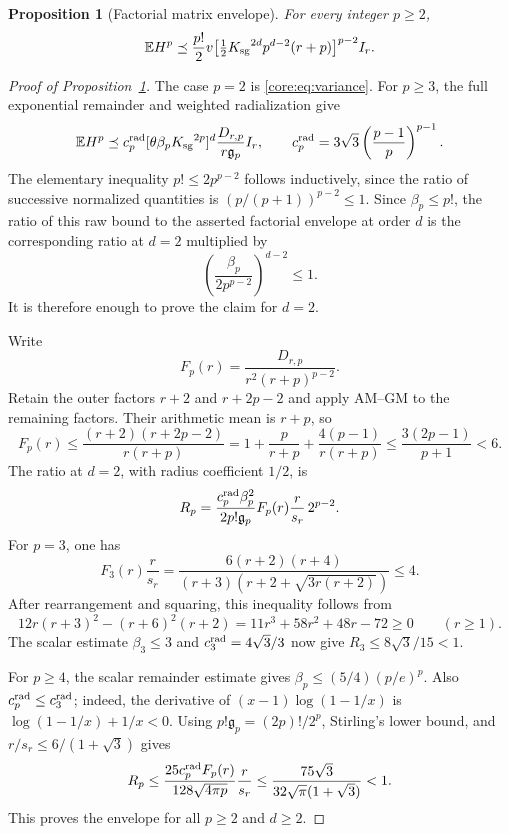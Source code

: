 \documentclass[11pt,a4paper]{article}
\newtheorem{proposition}[theorem]{Proposition}
\theoremstyle{definition}\newtheorem{definition}[theorem]{Definition}
\theoremstyle{remark}\newtheorem{remark}[theorem]{Remark}
\numberwithin{equation}{section}
\newcommand{\Ksg}{{K_{\mathrm{sg}}}}\newcommand{\Cfour}{{C_4}}
\newcommand{\gmom}{\mathfrak g}
\begin{document}
\begin{proposition}[Factorial matrix envelope]\label{core:prop:raw}
For every integer $p\ge2$,
\begin{equation}\label{core:eq:raw}
 \E H^p\preceq\frac{p!}{2}v
 \bigl[\tfrac12\Ksg^{2d}p^{d-2}(r+p)\bigr]^{p-2}I_r.
\end{equation}
\end{proposition}
\begin{proof}[Proof of Proposition~\ref{core:prop:raw}]
The case $p=2$ is \eqref{core:eq:variance}. For $p\ge3$, the full
exponential remainder and weighted radialization give
\[
 \E H^p\preceq
 c_p^{\rm rad}[\theta\beta_p\Ksg^{2p}]^d\frac{D_{r,p}}{r\gmom_p}I_r,
 \qquad
 c_p^{\rm rad}=3\sqrt3\left(\frac{p-1}{p}\right)^{p-1}.
\]
The elementary inequality $p!\le2p^{p-2}$ follows inductively, since
the ratio of successive normalized quantities is
$(p/(p+1))^{p-2}\le1$. Since $\beta_p\le p!$, the ratio of this raw
bound to the asserted factorial envelope at order $d$ is the
corresponding ratio at $d=2$ multiplied by
\[
 \left(\frac{\beta_p}{2p^{p-2}}\right)^{d-2}\le1.
\]
It is therefore enough to prove the claim for $d=2$.

Write
\[
 F_p(r)=\frac{D_{r,p}}{r^2(r+p)^{p-2}}.
\]
Retain the outer factors $r+2$ and $r+2p-2$ and apply AM--GM to
the remaining factors. Their arithmetic mean is $r+p$, so
\[
 F_p(r)\le\frac{(r+2)(r+2p-2)}{r(r+p)}
 =1+\frac p{r+p}+\frac{4(p-1)}{r(r+p)}
 \le\frac{3(2p-1)}{p+1}<6.
\]
The ratio at $d=2$, with radius coefficient $1/2$, is
\[
 R_p=\frac{c_p^{\rm rad}\beta_p^2}{2p!\gmom_p}
          F_p(r)\frac r{s_r}\,2^{p-2}.
\]
For $p=3$, one has
\[
 F_3(r)\frac r{s_r}
 =\frac{6(r+2)(r+4)}{(r+3)(r+2+\sqrt{3r(r+2)})}\le4.
\]
After rearrangement and squaring, this inequality follows from
\[
 12r(r+3)^2-(r+6)^2(r+2)
 =11r^3+58r^2+48r-72\ge0\qquad(r\ge1).
\]
The scalar estimate $\beta_3\le3$ and $c_3^{\rm rad}=4\sqrt3/3$ now give
$R_3\le8\sqrt3/15<1$.

For $p\ge4$, the scalar remainder estimate gives
$\beta_p\le(5/4)(p/e)^p$. Also $c_p^{\rm rad}\le c_3^{\rm rad}$; indeed, the derivative
of $(x-1)\log(1-1/x)$ is $\log(1-1/x)+1/x<0$.
Using $p!\gmom_p=(2p)!/2^p$, Stirling's lower bound, and
$r/s_r\le6/(1+\sqrt3)$ gives
\[
 R_p\le
 \frac{25c_p^{\rm rad}F_p(r)}{128\sqrt{4\pi p}}\frac r{s_r}
 \le\frac{75\sqrt3}{32\sqrt\pi(1+\sqrt3)}<1.
\]
This proves the envelope for all $p\ge2$ and $d\ge2$.
\end{proof}
\end{document}
